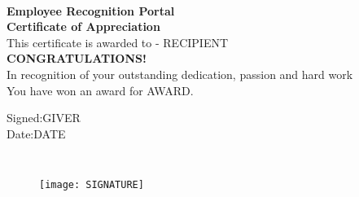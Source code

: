\documentclass[11pt,letterpaper]{article}
\begin{document}
    
    \begin{title} \\
    \begin{center}
    \textbf{{\normalsize \color{orange} Employee Recognition Portal}}\\
    \vspace{2em}
    \textbf{{\Large Certificate of Appreciation}}\\
    \vspace{2em}
    This certificate is awarded to - RECIPIENT\\
    \vspace{2em}
    \textbf{{\normalsize \color{red} CONGRATULATIONS!}}\\
    \color{black}In recognition of your outstanding dedication, passion and hard work\\
    You have won an award for \color{blue} AWARD.\\
    
    
    
    
    \end{center}
    \vspace{10em}
    \begin{flushright}
      Signed:GIVER\\
      Date:DATE
    \end{flushright}
    \texttt{\noindent
    \hspace{25ex}}
    \end{title}
    \begin{figure}[h!]
        \begin{flushright}
            \texttt{[image: SIGNATURE]}
        \end{flushright}
    \end{figure}
\end{document}
